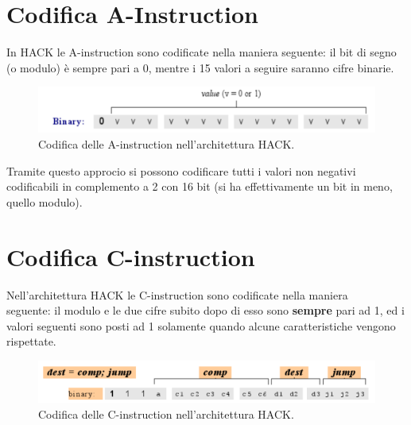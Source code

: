 \documentclass[12pt]{article}
\begin{document}
\section{Codifica A-Instruction}
\label{sec:A-instruction}
In HACK le A-instruction sono codificate nella maniera seguente: il bit di segno (o modulo) è sempre pari a 0, mentre i 15 valori a seguire saranno cifre binarie.
\begin{figure}[H]
    \centering
    \includegraphics[width=1\textwidth, height=.7\textheight,keepaspectratio]{realizzare_HACK/a_instruction.png} %
    \begin{center}
        \caption{\label{fig:codifica_a_instruction}Codifica delle A-instruction nell'architettura HACK.} %
    \end{center}
\end{figure}
Tramite questo approcio si possono codificare tutti i valori non negativi codificabili in complemento a 2 con 16 bit (si ha effettivamente un bit in meno, quello modulo).

\section{Codifica C-instruction}
\label{sec:C-instruction}
Nell'architettura HACK le C-instruction sono codificate nella maniera
\\
seguente: il modulo e le due cifre subito dopo di esso sono \textbf{sempre} pari ad 1, ed i valori seguenti sono posti ad 1 solamente quando alcune caratteristiche vengono rispettate.
\begin{figure}[H]
    \centering
    \includegraphics[width=1\textwidth, height=.7\textheight,keepaspectratio]{realizzare_HACK/c_instruction.png} %
    \begin{center}
        \caption{\label{fig:codifica_c_instruction}Codifica delle C-instruction nell'architettura HACK.} %
    \end{center}
\end{figure}
\end{document}
